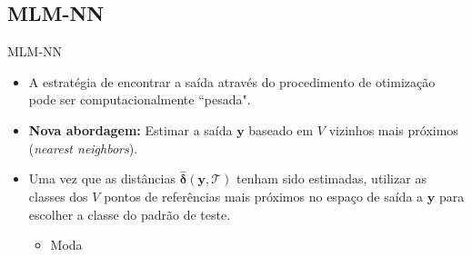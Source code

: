 \documentclass{beamer}
\begin{document}
\subsection{MLM-NN}
\begin{frame}{MLM-NN}

	\begin{itemize}
		\item A estratégia de encontrar a saída através do procedimento de otimização pode ser computacionalmente ``pesada".
		\item \textbf{Nova abordagem:} Estimar a saída $\mathbf{y}$ baseado em $V$ vizinhos mais próximos (\textit{nearest neighbors}).
		\item Uma vez que as distâncias $\hat{\boldsymbol{\delta}}(\mathbf{y}, \mathcal{T})$ tenham sido estimadas, utilizar as classes dos $V$ pontos de referências mais próximos no espaço de saída a $\mathbf{y}$ para escolher a classe do padrão de teste.
			\begin{itemize}
				\item Moda
			\end{itemize}
	\end{itemize}
	
	
	
\end{frame}


%	
%	
\end{document}
